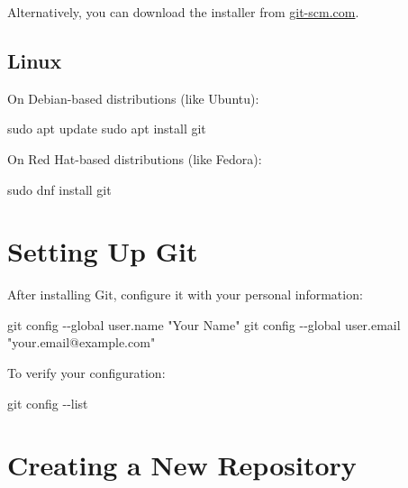 \documentclass[
  letterpaper,
  DIV=11,
  numbers=noendperiod]{scrreprt}
\newenvironment{Shaded}{\begin{snugshade}}{\end{snugshade}}
\newcommand{\AttributeTok}[1]{\textcolor[rgb]{0.40,0.45,0.13}{#1}}
\newcommand{\FunctionTok}[1]{\textcolor[rgb]{0.28,0.35,0.67}{#1}}
\newcommand{\NormalTok}[1]{\textcolor[rgb]{0.00,0.23,0.31}{#1}}
\newcommand{\StringTok}[1]{\textcolor[rgb]{0.13,0.47,0.30}{#1}}
\begin{document}
Alternatively, you can download the installer from
\href{https://git-scm.com/download/mac}{git-scm.com}.

\subsection{Linux}\label{linux-1}

On Debian-based distributions (like Ubuntu):

\begin{Shaded}
\begin{Highlighting}[]
\FunctionTok{sudo}\NormalTok{ apt update}
\FunctionTok{sudo}\NormalTok{ apt install git}
\end{Highlighting}
\end{Shaded}

On Red Hat-based distributions (like Fedora):

\begin{Shaded}
\begin{Highlighting}[]
\FunctionTok{sudo}\NormalTok{ dnf install git}
\end{Highlighting}
\end{Shaded}

\section{Setting Up Git}\label{setting-up-git-2}

After installing Git, configure it with your personal information:

\begin{Shaded}
\begin{Highlighting}[]
\FunctionTok{git}\NormalTok{ config }\AttributeTok{{-}{-}global}\NormalTok{ user.name }\StringTok{"Your Name"}
\FunctionTok{git}\NormalTok{ config }\AttributeTok{{-}{-}global}\NormalTok{ user.email }\StringTok{"your.email@example.com"}
\end{Highlighting}
\end{Shaded}

To verify your configuration:

\begin{Shaded}
\begin{Highlighting}[]
\FunctionTok{git}\NormalTok{ config }\AttributeTok{{-}{-}list}
\end{Highlighting}
\end{Shaded}

\section{Creating a New Repository}\label{creating-a-new-repository}
\end{document}
